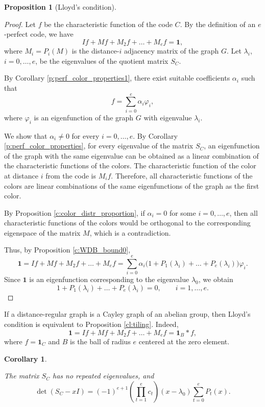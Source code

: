 \documentclass[11pt]{article}
\newtheorem{claim}{Proposition}[section]
\newtheorem{corollary}{Corollary}[section]
\theoremstyle{definition}
\begin{document}
{{{\begin{claim}[Lloyd's condition]
\end{claim}

\begin{proof}

Let $f$ be the characteristic function of the code $C$. By the
definition of an $e$-perfect code, we have
\[
If+Mf+M_2f+\dots+M_ef=\mathbf{1},
\]
where $M_i=P_i(M)$ is the distance-$i$ adjacency matrix of the
graph $G$. Let $\lambda_i$, $i=0,\dots,e$, be the eigenvalues of
the quotient matrix $S_C$.

By Corollary \ref{p:perf_color_properties1}, there exist suitable
coefficients $\alpha_i$ such that
\[
f=\sum_{i=0}^e\alpha_i\varphi_i,
\]
where $\varphi_i$ is an eigenfunction of the graph $G$ with
eigenvalue $\lambda_i$.

We show that $\alpha_i\neq0$ for every $i=0,\dots,e$. By
Corollary \ref{p:perf_color_properties}, for every eigenvalue of
the matrix $S_C$, an eigenfunction of the graph with the same
eigenvalue can be obtained as a linear combination of the
characteristic functions of the colors. The characteristic
function of the color at distance $i$ from the code is $M_if$.
Therefore, all characteristic functions of the colors are linear
combinations of the same eigenfunctions of the graph as the first
color.

By Proposition \ref{c:color_distr_proportion}, if $\alpha_i=0$ for some $i=0,\dots,e$, then all
characteristic functions of the colors would be orthogonal to the
corresponding eigenspace of the matrix $M$, which is a
contradiction.

Thus, by Proposition  \ref{c:WDB_bound0},
\[
\mathbf{1}
=If+Mf+M_2f+\dots+M_ef
=\sum_{i=0}^e
\alpha_i\bigl(1+P_1(\lambda_i)+\dots+P_e(\lambda_i)\bigr)\varphi_i.
\]
Since $\mathbf{1}$ is an eigenfunction corresponding to the
eigenvalue $\lambda_0$, we obtain
\[
1+P_1(\lambda_i)+\dots+P_e(\lambda_i)=0,
\qquad i=1,\dots,e.
\]

\end{proof}

If a distance-regular graph is a Cayley graph of an abelian group,
then Lloyd's condition is equivalent to Proposition  \ref{cl:tiling}.
Indeed,
\[
\mathbf{1}=If+Mf+M_2f+\dots+M_ef={\mathbf 1}_B*f,
\]
where $f={\mathbf 1}_C$ and $B$ is the ball of radius $e$ centered at the
zero element.

\begin{corollary}\label{cor:Lloyd}

The matrix $S_C$ has no repeated eigenvalues, and
\[
\det(S_C-xI)
=
(-1)^{e+1}
\left(\prod_{t=1}^e c_t\right)
(x-\lambda_0)
\sum_{t=0}^eP_t(x).
\]


\end{corollary}}}}
\end{document}
